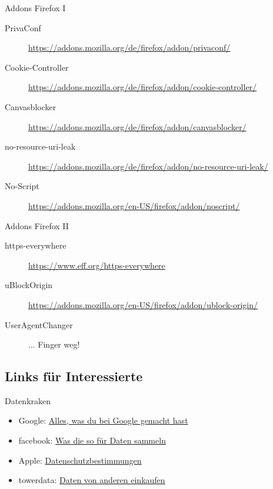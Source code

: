\documentclass[hyperref={colorlinks,linkcolor=white}, utf8]{beamer}
\begin{document}
	\begin{frame}{Addons Firefox I}
		\noindent
		\begin{description}
			\item[PrivaConf] \url{https://addons.mozilla.org/de/firefox/addon/privaconf/}
			\item[Cookie-Controller] \url{https://addons.mozilla.org/de/firefox/addon/cookie-controller/}
			\item[Canvasblocker] \url{https://addons.mozilla.org/de/firefox/addon/canvasblocker/}
			\item[no-resource-uri-leak] \url{https://addons.mozilla.org/de/firefox/addon/no-resource-uri-leak/}
			\item[No-Script] \url{https://addons.mozilla.org/en-US/firefox/addon/noscript/}
		\end{description}
	\end{frame}
	
	\begin{frame}{Addons Firefox II}
		\noindent
		\begin{description}
			\item[https-everywhere]\url{https://www.eff.org/https-everywhere}
			\item[uBlockOrigin]\url{https://addons.mozilla.org/en-US/firefox/addon/ublock-origin/}
			\item[UserAgentChanger]{... Finger weg!}
		\end{description}
	\end{frame}
	
	\subsection{Links für Interessierte}
	\begin{frame}{Datenkraken}
		\noindent
		\begin{itemize}
			\item Google: \href{https://myactivity.google.com/}{Alles, was du bei Google gemacht hast}
			\item facebook: \href{https://netzpolitik.org/2016/98-daten-die-facebook-ueber-dich-weiss-und-nutzt-um-werbung-auf-dich-zuzuschneiden/}{Was die so für Daten sammeln}
			\item Apple: \href{https://www.apple.com/privacy/privacy-policy/}{Datenschutzbestimmungen}
			\item towerdata: \href{http://intelligence.towerdata.com/pricing-append}{Daten von anderen einkaufen}
		\end{itemize}
	\end{frame}
	
\end{document}
